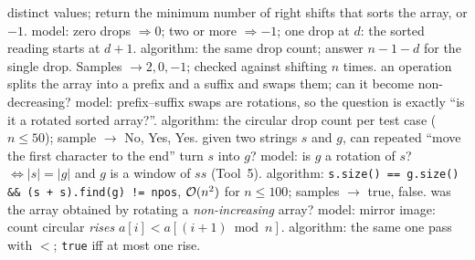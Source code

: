 \begin{variantsbox}
  {distinct values; return the minimum number of right shifts that sorts the array, or $-1$.}
  {model: zero drops $\Rightarrow 0$; two or more $\Rightarrow -1$; one drop at $d$: the sorted reading starts at $d+1$.}
  {algorithm: the same drop count; answer $n - 1 - d$ for the single drop. Samples $\to 2, 0, -1$; checked against shifting $n$ times.}
  {an operation splits the array into a prefix and a suffix and swaps them; can it become non-decreasing?}
  {model: prefix--suffix swaps are rotations, so the question is exactly ``is it a rotated sorted array?''.}
  {algorithm: the circular drop count per test case ($n \le 50$); sample $\to$ No, Yes, Yes.}
  {given two strings $s$ and $g$, can repeated ``move the first character to the end'' turn $s$ into $g$?}
  {model: is $g$ a rotation of $s$? $\iff |s| = |g|$ and $g$ is a window of $ss$ (Tool~5).}
  {algorithm: \texttt{s.size() == g.size() \&\& (s + s).find(g) != npos}, $\mathcal{O}(n^2)$ for $n \le 100$; samples $\to$ true, false.}
  {was the array obtained by rotating a \emph{non-increasing} array?}
  {model: mirror image: count circular \emph{rises} $a[i] < a[(i+1) \bmod n]$.}
  {algorithm: the same one pass with $<$; \texttt{true} iff at most one rise.}
\end{variantsbox}
